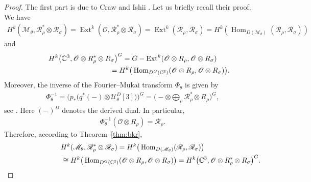 \documentclass[10pt,a4paper]{amsart}
\numberwithin{equation}{section}
\newcommand{\sM}{\mathscr{M}}
\newcommand{\sO}{\mathscr{O}}
\newcommand{\sR}{\mathscr{R}}
\newcommand{\sU}{\mathscr{U}}
\newcommand{\C}{{\mathbb C}}
\newcommand{\Hom}{\operatorname{Hom}}
\newcommand{\iso}{\cong}
\newcommand{\Ext}{\operatorname{Ext}}
\begin{document}
\begin{proof}
  The f\/irst part is due to Craw and Ishii \cite[Lemma~5.4]{Craw2004}.
  Let us brief\/ly recall their proof.  We have
  \begin{gather*}
    H^k(\sM_\theta,\sR_\rho^*\otimes\sR_\sigma)
    =\Ext^k(\sO,\sR_\rho^*\otimes\sR_\sigma)
     =\Ext^k(\sR_\rho,\sR_\sigma)
    =H^k(\Hom_{D(\sM_{\theta})}(\sR_\rho,\sR_\sigma))
  \end{gather*}
  and
  \begin{gather*}
    H^k\big(\C^3,\sO\otimes R_\rho^* \otimes R_\sigma\big)^G
     =G - \Ext^k(\sO \otimes R_\rho,\sO\otimes R_\sigma)\\
     \hphantom{H^k\big(\C^3,\sO\otimes R_\rho^* \otimes R_\sigma\big)^G}{}
     =H^k\big(\Hom_{D^G(\C^3)}(\sO \otimes R_\rho,\sO\otimes R_\sigma)\big).
  \end{gather*}
  Moreover, the inverse of the Fourier--Mukai transform $\Phi_\theta$
  is given by
  \begin{gather*}
    \Phi_\theta^{-1}
    =\big(p_*\big(q^*(-)\otimes\sU_\theta^D[3]\big)\big)^G
    =\Big({-}\otimes \bigoplus_\rho \sR_\rho^* \otimes R_\rho\Big)^G,
  \end{gather*}
  see \cite[p.~267]{Craw2004}.  Here $(-)^D$ denotes the derived
  dual.  In particular,
  \begin{gather*}%
    \Phi_\theta^{-1}(\sO \otimes R_\rho) = \sR_\rho.
  \end{gather*}
  Therefore, according to Theorem~\ref{thm:bkr},
  \begin{gather*}
    H^k(\sM_\theta,\sR_\rho^*\otimes\sR_\sigma)
     =H^k\big(\Hom_{D(\sM_{\theta})}(\sR_\rho,\sR_\sigma)\big) \\
  \hphantom{H^k(\sM_\theta,\sR_\rho^*\otimes\sR_\sigma)}{}
     \iso H^k\big(\Hom_{D^G(\C^3)}(\sO \otimes R_\rho,\sO\otimes R_\sigma)\big)
     = H^k\big(\C^3,\sO\otimes R_\rho^* \otimes R_\sigma\big)^G.
  \end{gather*}


\end{proof}
\end{document}
